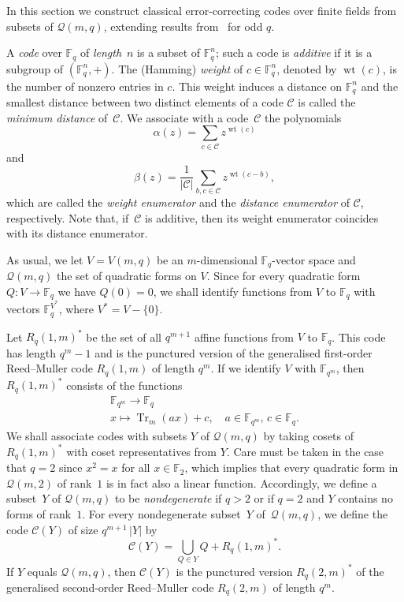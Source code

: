 \documentclass[10pt]{article}
\theoremstyle{definition}
\newcommand{\FF}{\mathbb{F}}
\newcommand{\Q}{\mathscr{Q}}
\newcommand{\Cc}{\mathcal{C}}
\newcommand{\abs}[1]{\lvert#1\rvert}
\DeclareMathOperator{\Tr}{Tr}
\DeclareMathOperator{\wt}{wt}
\begin{document}
In this section we construct classical error-correcting codes over finite fields from subsets of $\Q(m,q)$, extending results from~\cite{Sch2015} for odd $q$.
\par
A \emph{code} over $\FF_q$ of \emph{length}~$n$ is a subset of $\FF_q^n$; such a code is \emph{additive} if it is a subgroup of $(\FF_q^n,+)$. The (Hamming) \emph{weight} of $c\in\FF_q^n$, denoted by $\wt(c)$, is the number of nonzero entries in $c$. This weight induces a distance on $\FF_q^n$ and the smallest distance between two distinct elements of a code $\Cc$ is called the \emph{minimum distance} of~$\Cc$. We associate with a code~$\Cc$ the polynomials
\[
\alpha(z)=\sum_{c\in\Cc}z^{\wt(c)}
\]
and
\[
\beta(z)=\frac{1}{\abs{\Cc}}\sum_{b,c\in\Cc}z^{\wt(c-b)},
\]
which are called the \emph{weight enumerator} and the \emph{distance enumerator} of $\Cc$, respectively. Note that, if~$\Cc$ is additive, then its weight enumerator coincides with its distance enumerator. 
\par
As usual, we let $V=V(m,q)$ be an $m$-dimensional $\FF_q$-vector space and $\Q(m,q)$ the set of quadratic forms on $V$. Since for every quadratic form $Q:V\to\FF_q$ we have $Q(0)=0$, we shall identify functions from $V$ to $\FF_q$ with vectors $\FF_q^{V^*}$, where $V^*=V-\{0\}$.
\par
Let $R_q(1,m)^*$ be the set of all $q^{m+1}$ affine functions from $V$ to $\FF_q$. This code has length $q^m-1$ and is the punctured version of the generalised first-order Reed--Muller code $R_q(1,m)$ of length $q^m$. If we identify $V$ with $\FF_{q^m}$, then $R_q(1,m)^*$ consists of the functions
\begin{gather*}
\FF_{q^m}\to\FF_q\\
x\mapsto\Tr_m(ax)+c,\quad a\in\FF_{q^m},\,c\in\FF_q.
\end{gather*}
We shall associate codes with subsets $Y$ of $\Q(m,q)$ by taking cosets of $R_q(1,m)^*$ with coset representatives from $Y$. Care must be taken in the case that $q=2$ since $x^2=x$ for all $x\in\FF_2$, which implies that every quadratic form in $\Q(m,2)$ of rank~$1$ is in fact also a linear function. Accordingly, we define a subset~$Y$ of $\Q(m,q)$ to be \emph{nondegenerate} if $q>2$ or if $q=2$ and $Y$ contains no forms of rank~$1$. For every nondegenerate subset~$Y$ of~$\Q(m,q)$, we define the code $\Cc(Y)$ of size $q^{m+1}\,\abs{Y}$ by
\[
\Cc(Y)=\bigcup_{Q\in Y}Q+R_q(1,m)^*.
\]
If $Y$ equals $\Q(m,q)$, then $\Cc(Y)$ is the punctured version $R_q(2,m)^*$ of the generalised second-order Reed--Muller code $R_q(2,m)$ of length $q^m$.
\end{document}
